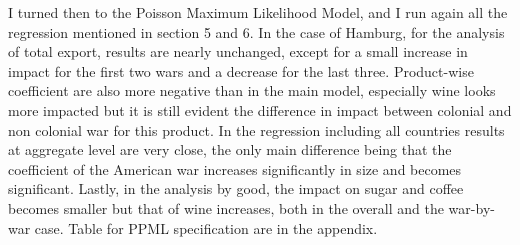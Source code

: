 \documentclass[12pt,a4paper,titlepage]{article}
\begin{document}
I turned then to the Poisson Maximum Likelihood Model, and I run again all the regression mentioned in section 5 and 6. In the case of Hamburg, for the analysis of total export, results are nearly unchanged, except for a small increase in impact for the first two wars and a decrease for the last three. Product-wise coefficient are also more negative than in the main model, especially wine looks more impacted but it is still evident the difference in impact between colonial and non colonial war for this product. In the regression including all countries results at aggregate level are very close, the only main difference being that the coefficient of the American war increases significantly in size and becomes significant. Lastly, in the analysis by good, the impact on sugar and coffee becomes smaller but that of wine increases, both in the overall and the war-by-war case. Table for PPML specification are in the appendix.
\end{document}
